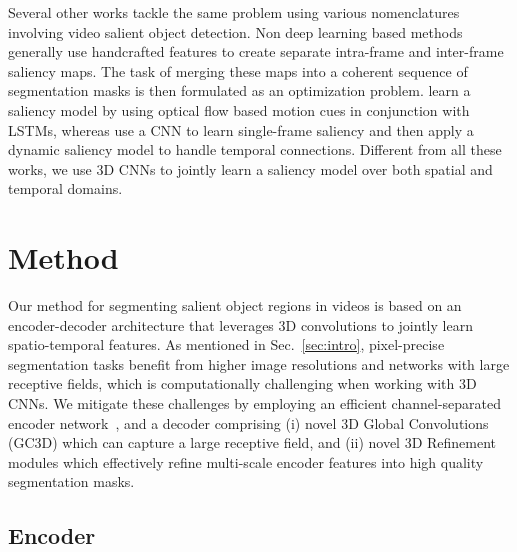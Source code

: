 \documentclass{bmvc2k}
\newcommand{\PAR}[1]{\vskip4pt \noindent {\bf #1~}}
\begin{document}
\PAR{Video Salient Object Detection}
Several other works tackle the same problem using various nomenclatures involving video salient object detection. Non deep learning based methods~\cite{Fang14TIP,Wang15CVPR,Wang15TIP,Liu17TCSVT} generally use handcrafted features to create separate intra-frame and inter-frame saliency maps. The task of merging these maps into a coherent sequence of segmentation masks is then formulated as an optimization problem. \cite{Li18CVPR_FGRN} learn a saliency model by using optical flow based motion cues in conjunction with LSTMs, whereas \cite{Wang18TIP} use a CNN to learn single-frame saliency and then apply a dynamic saliency model to handle temporal connections.
Different from all these works, we use 3D CNNs to jointly learn a saliency model over both spatial and temporal domains. 
\section{Method}
\label{sec:method}

Our method for segmenting salient object regions in videos is based on an encoder-decoder architecture that leverages 3D convolutions to jointly learn spatio-temporal features. As mentioned in Sec.~\ref{sec:intro}, pixel-precise segmentation tasks benefit from higher image resolutions and networks with large receptive fields, which is computationally challenging when working with 3D CNNs.
We mitigate these challenges by employing an efficient channel-separated encoder network~\cite{Tran19ICCV}, and a decoder comprising (i) novel 3D Global Convolutions (GC3D) which can capture a large receptive field, and (ii) novel 3D Refinement modules which effectively refine multi-scale encoder features into high quality segmentation masks.


\subsection{Encoder}
\label{sec:encoder}
\end{document}
